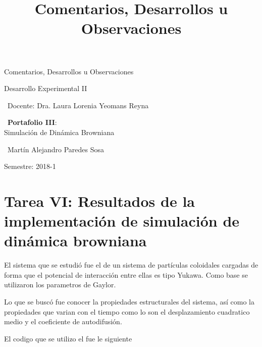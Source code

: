 \documentclass[12pt,letterpaper]{article}
\title{ Comentarios, Desarrollos u Observaciones  }
\begin{document}
\begin{titlepage}
	\centering
    \vspace*{2cm}
	{\Huge Comentarios, Desarrollos u Observaciones \par}
	\vfill
	{\Large Desarrollo Experimental II \par}
	\vfill
	{\large\ Docente: Dra. Laura Lorenia Yeomans Reyna \par}
    \vfill
    {\large\ \textbf{Portafolio III}:\\ Simulación de Dinámica Browniana \par}
    \vfill
    {\large\ Martín Alejandro Paredes Sosa \par}
	\vfill
	{\large Semestre: 2018-1\par}
\end{titlepage}

\section*{Tarea VI: Resultados de la implementación de simulación de dinámica browniana}

El sistema que se estudió fue el de un sistema de partículas coloidales cargadas de forma que el potencial de interacción entre ellas es tipo Yukawa. Como base se utilizaron los parametros de Gaylor. 

Lo que se buscó fue conocer la propiedades estructurales del sistema, así como la propiedades que varian con el tiempo como lo son el desplazamiento cuadratico medio y el coeficiente de autodifusión.


El codigo que se utilizo el fue le siguiente


%
%
%
%
%
%
%
%
\end{document}
